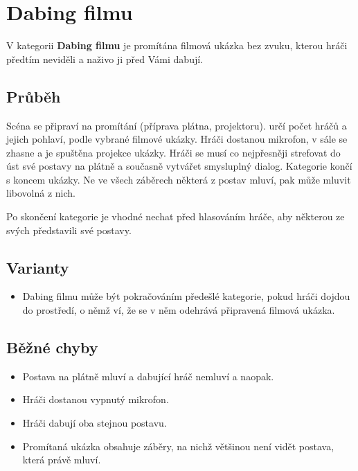 \documentclass[main.tex]{subfiles}
\begin{document}
 
 
 
 
\needspace{5cm} \section{Dabing filmu} \label{dabing filmu}  
 
V kategorii \textbf{Dabing filmu}{} je promítána filmová ukázka bez zvuku, kterou hráči předtím neviděli a naživo ji před Vámi dabují. 
 
\subsection{ Průběh } Scéna se připraví na promítání (příprava plátna, projektoru).  určí počet hráčů a jejich pohlaví, podle vybrané filmové ukázky. Hráči dostanou mikrofon, v sále se zhasne a je spuštěna projekce ukázky. Hráči se musí co nejpřesněji strefovat do úst své postavy na plátně a současně vytvářet smysluplný dialog. Kategorie končí s koncem ukázky. Ne ve všech záběrech některá z postav mluví, pak může mluvit libovolná z nich. 
 
Po skončení kategorie je vhodné nechat před hlasováním hráče, aby některou ze svých  představili své postavy. 
 
\subsection{ Varianty } \begin{itemize}
\item Dabing filmu může být pokračováním předešlé kategorie, pokud hráči dojdou do prostředí, o němž  ví, že se v něm odehrává připravená filmová ukázka.
\end{itemize}
 
\subsection{ Běžné chyby } \begin{itemize}
\item Postava na plátně mluví a dabující hráč nemluví a naopak.
\item Hráči dostanou vypnutý mikrofon.
\item Hráči dabují oba stejnou postavu.
\item Promítaná ukázka obsahuje záběry, na nichž většinou není vidět postava, která právě mluví.
\end{itemize}
 
\end{document}
